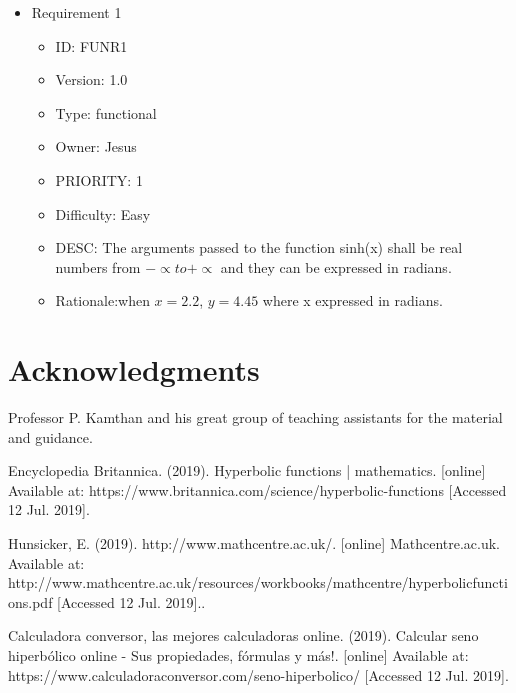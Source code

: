\documentclass[12pt]{report}
\begin{document}
\begin{itemize}
\item Requirement 1
\begin{itemize}
\item ID:       FUNR1
\item Version:  1.0
\item Type:     functional
\item Owner:    Jesus
\item PRIORITY: 1 
\item Difficulty: Easy
\item DESC: The arguments passed to the function sinh(x) shall be real numbers from $-\propto to +\propto$ and they can be expressed in radians.
\item Rationale:when $x=2.2$, $ y = 4.45$ where x expressed in radians.

\end{itemize}

\end{itemize}
%

\newpage
\section{Acknowledgments}

 Professor P. Kamthan and his great group of teaching assistants for the material and guidance.
\newpage
 
\begin{thebibliography}{111}
   
Encyclopedia Britannica. (2019). Hyperbolic functions | mathematics. [online] Available at: https://www.britannica.com/science/hyperbolic-functions [Accessed 12 Jul. 2019].

{}
    Hunsicker, E. (2019). http://www.mathcentre.ac.uk/. [online] Mathcentre.ac.uk. Available at: http://www.mathcentre.ac.uk/resources/workbooks/mathcentre/hyperbolicfunctions.pdf [Accessed 12 Jul. 2019]..
  
   Calculadora conversor, las mejores calculadoras online. (2019). Calcular seno hiperbólico online - Sus propiedades, fórmulas y más!. [online] Available at: https://www.calculadoraconversor.com/seno-hiperbolico/ [Accessed 12 Jul. 2019].


\end{thebibliography}
\end{document}
